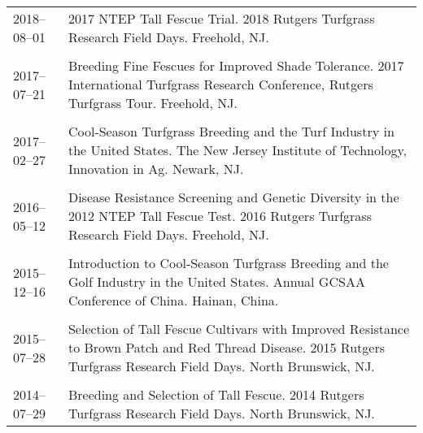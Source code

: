 \documentclass[letterpaper,11pt, english]{article}
\begin{document}
\begin{flushleft}
  \begin{tabularx}{\textwidth}{@{}lX@{}}
2018--08--01 \hspace{1cm} & 2017 NTEP Tall Fescue Trial. 2018 Rutgers Turfgrass Research Field Days. Freehold, NJ. \\
\\[-0.2cm]
2017--07--21 \hspace{1cm} & Breeding Fine Fescues for Improved Shade Tolerance. 2017 International Turfgrass Research Conference, Rutgers Turfgrass Tour. Freehold, NJ. \\
\\[-0.2cm]
2017--02--27 \hspace{1cm} & Cool-Season Turfgrass Breeding and the Turf Industry in the United States. The New Jersey Institute of Technology, Innovation in Ag. Newark, NJ. \\
\\[-0.2cm]
2016--05--12 \hspace{1cm} & Disease Resistance Screening and Genetic Diversity in the 2012 NTEP Tall Fescue Test. 2016 Rutgers Turfgrass Research Field Days. Freehold, NJ. \\
\\[-0.2cm]
2015--12--16 \hspace{1cm} & Introduction to Cool-Season Turfgrass Breeding and the Golf Industry in the United States. Annual GCSAA Conference of China. Hainan, China. \\
\\[-0.2cm] 
2015--07--28 \hspace{1cm} & Selection of Tall Fescue Cultivars with Improved Resistance to Brown Patch and Red Thread Disease. 2015 Rutgers Turfgrass Research Field Days. North Brunswick, NJ. \\
\\[-0.2cm] 
2014--07--29 \hspace{1cm} & Breeding and Selection of Tall Fescue. 2014 Rutgers Turfgrass Research Field Days. North Brunswick, NJ. \\
  \end{tabularx}
\end{flushleft}
\end{document}

